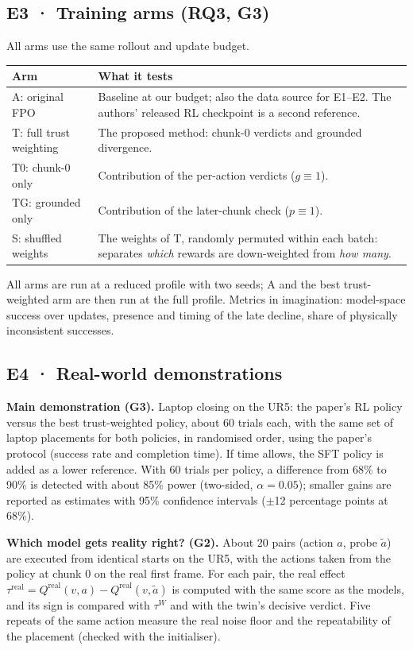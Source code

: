 \subsection{E3 · Training arms (RQ3, G3)}
All arms use the same rollout and update budget.
\begin{center}\small
\begin{tabularx}{\linewidth}{@{}lX@{}}
\toprule
\textbf{Arm} & \textbf{What it tests}\\
\midrule
A: original FPO & Baseline at our budget; also the data source for E1--E2. The authors' released RL checkpoint is a second reference.\\
T: full trust weighting & The proposed method: chunk-0 verdicts and grounded divergence.\\
T0: chunk-0 only & Contribution of the per-action verdicts ($g\equiv1$).\\
TG: grounded only & Contribution of the later-chunk check ($p\equiv1$).\\
S: shuffled weights & The weights of T, randomly permuted within each batch: separates \emph{which} rewards are down-weighted from \emph{how many}.\\
\bottomrule
\end{tabularx}
\end{center}
All arms are run at a reduced profile with two seeds; A and the best trust-weighted arm are then run at the full profile. Metrics in imagination: model-space success over updates, presence and timing of the late decline, share of physically inconsistent successes.

\subsection{E4 · Real-world demonstrations}\label{method:sec:exp-real}
\textbf{Main demonstration (G3).} Laptop closing on the UR5: the paper's RL policy versus the best trust-weighted policy, about 60 trials each, with the same set of laptop placements for both policies, in randomised order, using the paper's protocol (success rate and completion time). If time allows, the SFT policy is added as a lower reference. With 60 trials per policy, a difference from 68\% to 90\% is detected with about 85\% power (two-sided, $\alpha=0.05$); smaller gains are reported as estimates with 95\% confidence intervals ($\pm$12 percentage points at 68\%).

\textbf{Which model gets reality right? (G2).} About 20 pairs (action $a$, probe $\tilde a$) are executed from identical starts on the UR5, with the actions taken from the policy at chunk 0 on the real first frame. For each pair, the real effect $\tau^{\mathrm{real}}=Q^{\mathrm{real}}(v,a)-Q^{\mathrm{real}}(v,\tilde a)$ is computed with the same score as the models, and its sign is compared with $\tau^W$ and with the twin's decisive verdict. Five repeats of the same action measure the real noise floor and the repeatability of the placement (checked with the initialiser).

